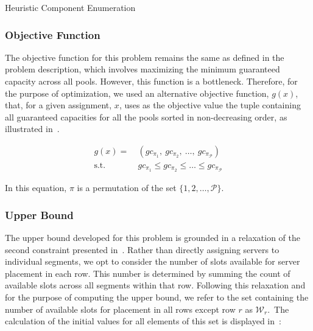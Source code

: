 \begin{algorithm}[h]
  
  \caption{Heuristic Component Enumeration}
  \label{algorithm:odc-enum-heuristic}
\end{algorithm}

\subsubsection*{Objective Function}

The objective function for this problem remains the same as defined in the
problem description, which involves maximizing the minimum guaranteed capacity
across all pools. However, this function is a bottleneck. Therefore, for the
purpose of optimization, we used an alternative objective function, $g(x)$,
that, for a given assignment, $x$, uses as the objective value the tuple
containing all guaranteed capacities for all the pools sorted in non-decreasing
order, as illustrated in~.

\begin{equation}
  \label{eq:objective-2}
  \begin{aligned}
    g(x)         =\  & (gc_{\pi_1},\ gc_{\pi_2},\ \ldots,\ gc_{\pi_\mathcal{P}})     \\
    \text{s.t. }     & gc_{\pi_1} \le gc_{\pi_2} \le \ldots \le gc_{\pi_\mathcal{P}}
  \end{aligned}
\end{equation}

In this equation, $\pi$ is a permutation of the set $\{1, 2, \ldots, \mathcal{P}\}$.

\subsubsection*{Upper Bound}

The upper bound developed for this problem is grounded in a relaxation of the
second constraint presented in~. Rather than directly
assigning servers to individual segments, we opt to consider the number of slots
available for server placement in each row. This number is determined by summing
the count of available slots across all segments within that row.  Following
this relaxation and for the purpose of computing the upper bound, we refer to
the set containing the number of available slots for placement in all rows
except row $r$ as $\mathcal{W}_{r}$.~The calculation of the initial values for
all elements of this set is displayed in~:

